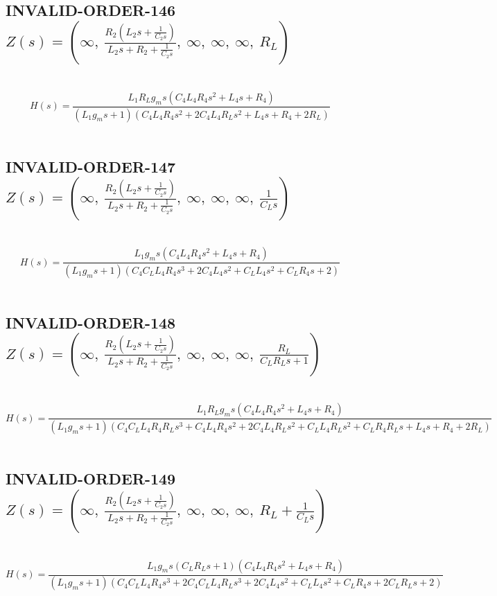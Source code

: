 \documentclass{article}
\begin{document}
\subsection{INVALID-ORDER-146 $Z(s) = \left( \infty, \  \frac{R_{2} \left(L_{2} s + \frac{1}{C_{2} s}\right)}{L_{2} s + R_{2} + \frac{1}{C_{2} s}}, \  \infty, \  \infty, \  \infty, \  R_{L}\right)$ } \ 
\textbf{\[H(s) = \frac{L_{1} R_{L} g_{m} s \left(C_{4} L_{4} R_{4} s^{2} + L_{4} s + R_{4}\right)}{\left(L_{1} g_{m} s + 1\right) \left(C_{4} L_{4} R_{4} s^{2} + 2 C_{4} L_{4} R_{L} s^{2} + L_{4} s + R_{4} + 2 R_{L}\right)}\] } \ 
\subsection{INVALID-ORDER-147 $Z(s) = \left( \infty, \  \frac{R_{2} \left(L_{2} s + \frac{1}{C_{2} s}\right)}{L_{2} s + R_{2} + \frac{1}{C_{2} s}}, \  \infty, \  \infty, \  \infty, \  \frac{1}{C_{L} s}\right)$ } \ 
\textbf{\[H(s) = \frac{L_{1} g_{m} s \left(C_{4} L_{4} R_{4} s^{2} + L_{4} s + R_{4}\right)}{\left(L_{1} g_{m} s + 1\right) \left(C_{4} C_{L} L_{4} R_{4} s^{3} + 2 C_{4} L_{4} s^{2} + C_{L} L_{4} s^{2} + C_{L} R_{4} s + 2\right)}\] } \ 
\subsection{INVALID-ORDER-148 $Z(s) = \left( \infty, \  \frac{R_{2} \left(L_{2} s + \frac{1}{C_{2} s}\right)}{L_{2} s + R_{2} + \frac{1}{C_{2} s}}, \  \infty, \  \infty, \  \infty, \  \frac{R_{L}}{C_{L} R_{L} s + 1}\right)$ } \ 
\textbf{\[H(s) = \frac{L_{1} R_{L} g_{m} s \left(C_{4} L_{4} R_{4} s^{2} + L_{4} s + R_{4}\right)}{\left(L_{1} g_{m} s + 1\right) \left(C_{4} C_{L} L_{4} R_{4} R_{L} s^{3} + C_{4} L_{4} R_{4} s^{2} + 2 C_{4} L_{4} R_{L} s^{2} + C_{L} L_{4} R_{L} s^{2} + C_{L} R_{4} R_{L} s + L_{4} s + R_{4} + 2 R_{L}\right)}\] } \ 
\subsection{INVALID-ORDER-149 $Z(s) = \left( \infty, \  \frac{R_{2} \left(L_{2} s + \frac{1}{C_{2} s}\right)}{L_{2} s + R_{2} + \frac{1}{C_{2} s}}, \  \infty, \  \infty, \  \infty, \  R_{L} + \frac{1}{C_{L} s}\right)$ } \ 
\textbf{\[H(s) = \frac{L_{1} g_{m} s \left(C_{L} R_{L} s + 1\right) \left(C_{4} L_{4} R_{4} s^{2} + L_{4} s + R_{4}\right)}{\left(L_{1} g_{m} s + 1\right) \left(C_{4} C_{L} L_{4} R_{4} s^{3} + 2 C_{4} C_{L} L_{4} R_{L} s^{3} + 2 C_{4} L_{4} s^{2} + C_{L} L_{4} s^{2} + C_{L} R_{4} s + 2 C_{L} R_{L} s + 2\right)}\] } \ 
\end{document}
